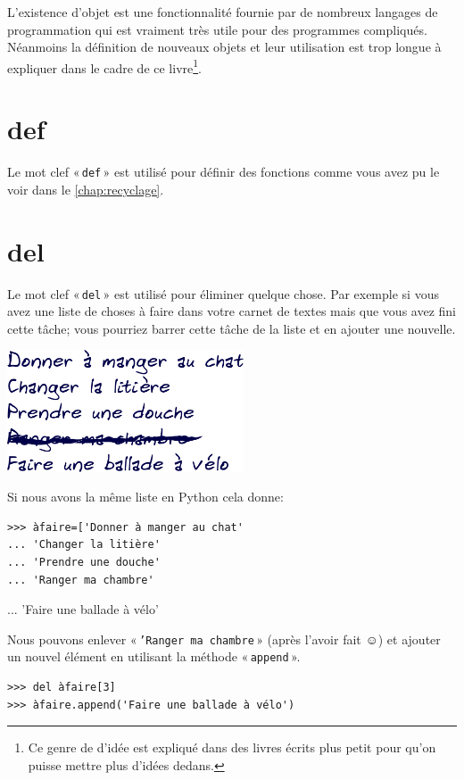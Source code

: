L'existence d'objet est une fonctionnalité fournie par de nombreux langages de programmation qui est vraiment très utile pour des programmes compliqués. Néanmoins la définition de nouveaux objets et leur utilisation est trop longue à expliquer dans le cadre de ce livre\footnote{Ce genre de d'idée est expliqué dans des livres écrits plus petit pour qu'on puisse mettre plus d'idées dedans.}.

\section*{def}
Le mot clef « \texttt{def} » est utilisé pour définir des fonctions comme vous avez pu le voir dans le \autoref{chap:recyclage}.

\section*{del}
Le mot clef « \texttt{del} » est utilisé pour éliminer quelque chose. Par exemple si vous avez une liste de choses à faire dans votre carnet de textes mais que vous avez fini cette tâche; vous pourriez barrer cette tâche de la liste et en ajouter une nouvelle.

\begin{center}
\includegraphics*[width=70mm]{images/liste2}
\end{center}

Si nous avons la même liste en Python cela donne:
\begin{Verbatim}[frame=single,rulecolor=\color{gray}]
>>> àfaire=['Donner à manger au chat'
... 'Changer la litière'
... 'Prendre une douche'
... 'Ranger ma chambre'
\end{Verbatim}

... 'Faire une ballade à vélo'

Nous pouvons enlever « \texttt{'Ranger ma chambre} » (après l'avoir fait ☺) 
et ajouter un nouvel élément en utilisant la méthode « \texttt{append} ».

\begin{Verbatim}[frame=single,rulecolor=\color{gray}]
>>> del àfaire[3]
>>> àfaire.append('Faire une ballade à vélo')
\end{Verbatim}

